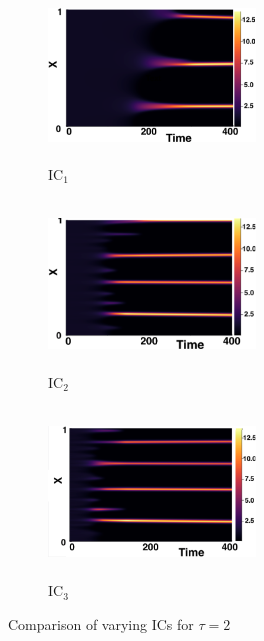 \documentclass[12pt]{report}
\begin{document}
\begin{figure}[H]
    \centering
    \begin{subfigure}[b]{0.32\textwidth}
        \centering
        \includegraphics[width=5.5cm,height=4.5cm]{gaff2.png}
        \caption{$\text{IC}_1$}
        \label{}
    \end{subfigure}
    \hfill
    \begin{subfigure}[b]{0.32\textwidth}
        \centering
        \includegraphics[width=5.5cm,height=4.5cm]{ic22.png}
        \caption{$\text{IC}_2$}
        \label{}
    \end{subfigure}
    \hfill
    \begin{subfigure}[b]{0.32\textwidth}
        \centering
        \includegraphics[width=5.5cm,height=4.5cm]{ic32.png}
        \caption{$\text{IC}_3$}
        \label{}
    \end{subfigure}
    \caption{Comparison of varying ICs for $\tau=2$}
    \label{fig:figtau2}
\end{figure}
\end{document}

